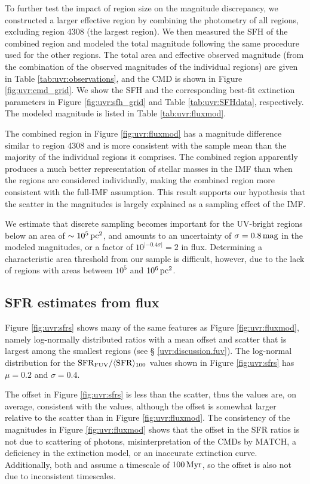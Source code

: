 To further test the impact of region size on the magnitude discrepancy, we
constructed a larger effective region by combining the photometry of all
regions, excluding region 4308 (the largest region). We then measured the SFH
of the combined region and modeled the total \fuv{} magnitude following the same
procedure used for the other regions. The total area and effective observed \fuv{}
magnitude (from the combination of the observed magnitudes of the individual
regions) are given in Table \ref{tab:uvr:observations}, and the CMD is shown in
Figure \ref{fig:uvr:cmd_grid}. We show the SFH and the corresponding best-fit
extinction parameters in Figure \ref{fig:uvr:sfh_grid} and Table \ref{tab:uvr:SFHdata},
respectively. The modeled \fuv{} magnitude is listed in Table \ref{tab:uvr:fluxmod}.

The combined region in Figure \ref{fig:uvr:fluxmod} has a magnitude difference
similar to region 4308 and is more consistent with the sample mean than the
majority of the individual regions it comprises. The combined region apparently
produces a much better representation of stellar masses in the IMF than when
the regions are considered individually, making the combined region more
consistent with the full-IMF assumption. This result supports our hypothesis
that the scatter in the magnitudes is largely explained as a sampling effect of
the IMF.

We estimate that discrete sampling becomes important for the UV-bright regions
below an area of $\sim 10^5\,\mathrm{pc}^2$, and amounts to an uncertainty of
$\sigma=0.8\,\mathrm{mag}$ in the modeled \fuv{} magnitudes, or a factor of
$10^{|-0.4\sigma|} = 2$ in flux. Determining a characteristic area threshold
from our sample is difficult, however, due to the lack of regions with areas
between $10^5$ and $10^6\,\mathrm{pc}^2$.



\subsection{SFR estimates from \fuv{} flux}\label{uvr:discussion.sfrs}

Figure \ref{fig:uvr:sfrs} shows many of the same features as Figure
\ref{fig:uvr:fluxmod}, namely log-normally distributed ratios with a mean offset
and scatter that is largest among the smallest regions (see \S
\ref{uvr:discussion.fuv}). The log-normal distribution for the
$\mathrm{SFR}_{\mathrm{FUV}} / \langle\mathrm{SFR}\rangle_{100}$ values shown in Figure
\ref{fig:uvr:sfrs} has $\mu=0.2$ and $\sigma=0.4$.

The offset in Figure \ref{fig:uvr:sfrs} is less than the scatter, thus the
\sfrfuv{} values are, on average, consistent with the \sfroneh{} values, although the offset is somewhat larger
relative to the scatter than in Figure \ref{fig:uvr:fluxmod}. The consistency of
the \fuv{} magnitudes in Figure \ref{fig:uvr:fluxmod} shows that the offset in the SFR
ratios is not due to scattering of \fuv{} photons, misinterpretation of the CMDs
by MATCH, a deficiency in the extinction model, or an inaccurate extinction
curve. Additionally, both \sfrfuv{} and \sfroneh{} assume a timescale of $100\,\mathrm{Myr}$, so the
offset is also not due to inconsistent timescales.

